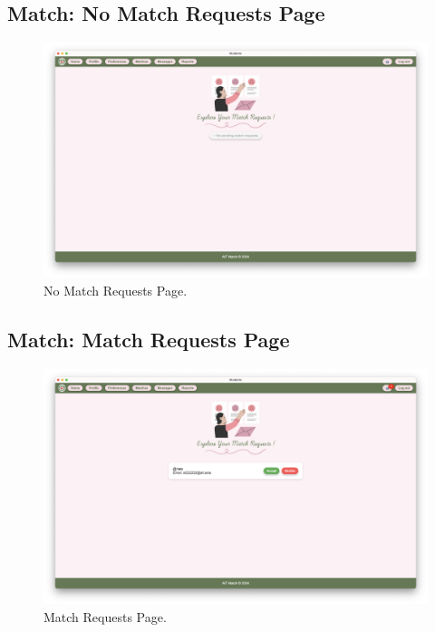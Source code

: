         \subsection{Match: No Match Requests Page}
        \begin{figure}[h]
                \centering
                \captionsetup{justification=centering, singlelinecheck=false, labelsep=space}
                \includegraphics[width=5in]{figures/results/matches/no-match-request-page.png} 
                \caption{No Match Requests Page.}
                \label{fig:no-match-request-page}
            \end{figure}

        \subsection{Match: Match Requests Page}
        \begin{figure}[h]
                \centering
                \captionsetup{justification=centering, singlelinecheck=false, labelsep=space}
                \includegraphics[width=5in]{figures/results/matches/match-request-page.png} 
                \caption{Match Requests Page.}
                \label{fig:match-request-page}
            \end{figure}


